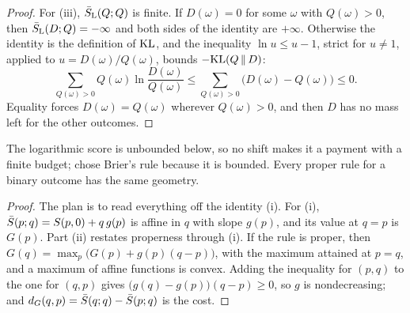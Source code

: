 \begin{refsection}
\begin{proof}
For (iii), $\bar S_{\mathrm L}(Q;Q)$ is finite. If $D(\omega)=0$ for some $\omega$ with $Q(\omega)>0$, then $\bar S_{\mathrm L}(D;Q)=-\infty$ and both sides of the identity are $+\infty$. Otherwise the identity is the definition of $\mathrm{KL}$, and the inequality $\ln u\le u-1$, strict for $u\ne1$, applied to $u=D(\omega)/Q(\omega)$, bounds $-\mathrm{KL}(Q\,\|\,D)$:
\[
\sum_{Q(\omega)>0}Q(\omega)\ln\frac{D(\omega)}{Q(\omega)}\le\sum_{Q(\omega)>0}\bigl(D(\omega)-Q(\omega)\bigr)\le0.
\]
Equality forces $D(\omega)=Q(\omega)$ wherever $Q(\omega)>0$, and then $D$ has no mass left for the other outcomes.
\end{proof}

The logarithmic score is unbounded below, so no shift makes it a payment with a finite budget; \textcite{AzarMicali2012} chose Brier's rule because it is bounded. Every proper rule for a binary outcome has the same geometry.


\begin{proof}
The plan is to read everything off the identity (i). For (i), $\bar S(p;q)=S(p,0)+q\,g(p)$ is affine in $q$ with slope $g(p)$, and its value at $q=p$ is $G(p)$. Part (ii) restates properness through (i). If the rule is proper, then $G(q)=\max_p\bigl(G(p)+g(p)(q-p)\bigr)$, with the maximum attained at $p=q$, and a maximum of affine functions is convex. Adding the inequality for $(p,q)$ to the one for $(q,p)$ gives $\bigl(g(q)-g(p)\bigr)(q-p)\ge0$, so $g$ is nondecreasing; and $d_G(q,p)=\bar S(q;q)-\bar S(p;q)$ is the cost.


\end{proof}
\end{refsection}
